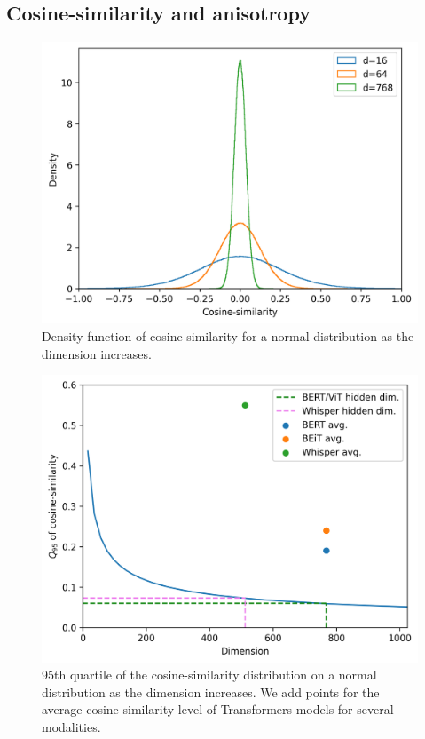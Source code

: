 \subsection{Cosine-similarity and anisotropy}
\begin{figure}[ht]
    \centering
    \includegraphics[width=\linewidth]{sources/part_1/anisotropy/imgs/cosine_v_density.png}
    \caption{Density function of cosine-similarity for a normal distribution as the dimension increases.}
    \label{fig:cosine_v_density}
\end{figure}
\begin{figure}[ht]
    \centering
    \includegraphics[width=\linewidth]{sources/part_1/anisotropy/imgs/q95_dimension.png}
    \caption{95th quartile of the cosine-similarity distribution on a normal distribution as the dimension increases. We add points for the average cosine-similarity level of Transformers models for several modalities.}
    \label{fig:q95}
\end{figure}

